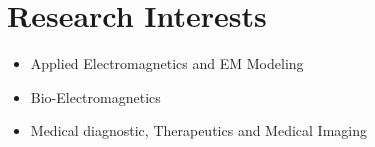 \documentclass[a4paper,10pt]{article} %
\begin{document}
\section{Research Interests}
\color{Black}
\begin{itemize}
	
					
	
\item Applied Electromagnetics and EM Modeling
\item Bio-Electromagnetics
	\item Medical diagnostic, Therapeutics and  Medical Imaging

			
			
		
	\end{itemize}
\end{document}
